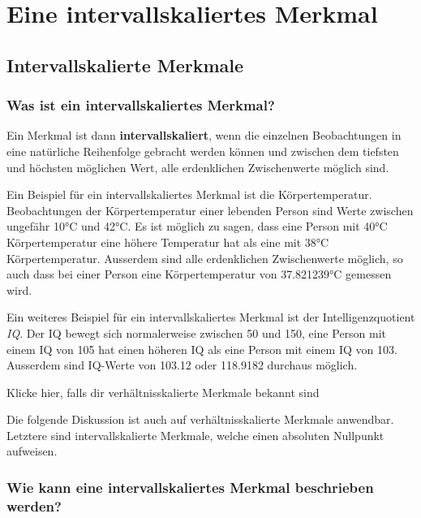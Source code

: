 \documentclass[
]{book}
\theoremstyle{definition}
\theoremstyle{definition}
\theoremstyle{definition}
\theoremstyle{definition}
\theoremstyle{remark}
\begin{document}
\part{Eine intervallskaliertes Merkmal}\label{part-eine-intervallskaliertes-merkmal}

\chapter{Intervallskalierte Merkmale}\label{intervallskalierte-merkmale}

\section{Was ist ein intervallskaliertes Merkmal?}\label{intervallskalierte-merkmale-definition}

Ein Merkmal ist dann \textbf{intervallskaliert}, wenn die einzelnen Beobachtungen in eine natürliche Reihenfolge gebracht werden können und zwischen dem tiefsten und höchsten möglichen Wert, alle erdenklichen Zwischenwerte möglich sind.

Ein Beispiel für ein intervallskaliertes Merkmal ist die Körpertemperatur. Beobachtungen der Körpertemperatur einer lebenden Person sind Werte zwischen ungefähr 10°C und 42°C. Es ist möglich zu sagen, dass eine Person mit 40°C Körpertemperatur eine höhere Temperatur hat als eine mit 38°C Körpertemperatur. Ausserdem sind alle erdenklichen Zwischenwerte möglich, so auch dass bei einer Person eine Körpertemperatur von 37.821239°C gemessen wird.

Ein weiteres Beispiel für ein intervallskaliertes Merkmal ist der Intelligenzquotient \emph{IQ}. Der IQ bewegt sich normalerweise zwischen 50 und 150, eine Person mit einem IQ von 105 hat einen höheren IQ als eine Person mit einem IQ von 103. Ausserdem sind IQ-Werte von 103.12 oder 118.9182 durchaus möglich.

Klicke hier, falls dir verhältnisskalierte Merkmale bekannt sind

Die folgende Diskussion ist auch auf verhältnisskalierte Merkmale anwendbar. Letztere sind intervallskalierte Merkmale, welche einen absoluten Nullpunkt aufweisen.

\section{Wie kann eine intervallskaliertes Merkmal beschrieben werden?}\label{intervallskalierte-merkmale-beschreibung}
\end{document}
